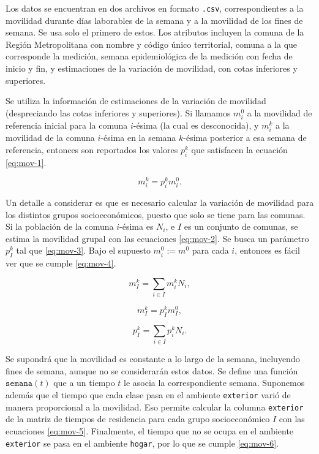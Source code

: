 Los datos se encuentran en dos archivos en formato \texttt{.csv}, correspondientes a la movilidad durante días laborables de la semana y a la movilidad de los fines de semana. Se usa solo el primero de estos. Los atributos incluyen la comuna de la Región Metropolitana con nombre y código único territorial, comuna a la que corresponde la medición, semana epidemiológica de la medición con fecha de inicio y fin, y estimaciones de la variación de movilidad, con cotas inferiores y superiores.

Se utiliza la información de estimaciones de la variación de movilidad (despreciando las cotas inferiores y superiores). Si llamamos \(m_i^0\) a la movilidad de referencia inicial para la comuna \(i\)-ésima (la cual es desconocida), y \(m_i^k\) a la movilidad de la comuna \(i\)-ésima en la semana \(k\)-ésima posterior a esa semana de referencia, entonces son reportados los valores \(p_i^k\) que satisfacen la ecuación \ref{eq:mov-1}.

\begin{equation}\label{eq:mov-1}
m_i^k = p_i^k m_i^0.
\end{equation}

Un detalle a considerar es que es necesario calcular la variación de movilidad para los distintos grupos socioeconómicos, puesto que solo se tiene para las comunas. Si la población de la comuna \(i\)-ésima es \(N_i\), e \(I\) es un conjunto de comunas, se estima la movilidad grupal con las ecuaciones \ref{eq:mov-2}. Se busca un parámetro \(p_I^k\) tal que \ref{eq:mov-3}. Bajo el supuesto \(m_i^0 := m^0\) para cada \(i\), entonces es fácil ver que se cumple \ref{eq:mov-4}.

\begin{equation}\label{eq:mov-2}
m^k_I = \sum_{i \in I}m^k_i N_i,
\end{equation}


\begin{equation}\label{eq:mov-3}
m_I^k = p_I^k m_I^0,
\end{equation}


\begin{equation}\label{eq:mov-4}
p_I^k = \sum_{i \in I} p_i^k N_i.
\end{equation}

Se supondrá que la movilidad es constante a lo largo de la semana, incluyendo fines de semana, aunque no se considerarán estos datos. Se define una función \(\mathtt{semana}(t)\) que a un tiempo \(t\) le asocia la correspondiente semana. Suponemos además que el tiempo que cada clase pasa en el ambiente \texttt{exterior} varió de manera proporcional a la movilidad. Eso permite calcular la columna \texttt{exterior} de la matriz de tiempos de residencia para cada grupo socioeconómico \(I\) con las ecuaciones \ref{eq:mov-5}. Finalmente, el tiempo que no se ocupa en el ambiente \texttt{exterior} se pasa en el ambiente \texttt{hogar}, por lo que se cumple \ref{eq:mov-6}.

